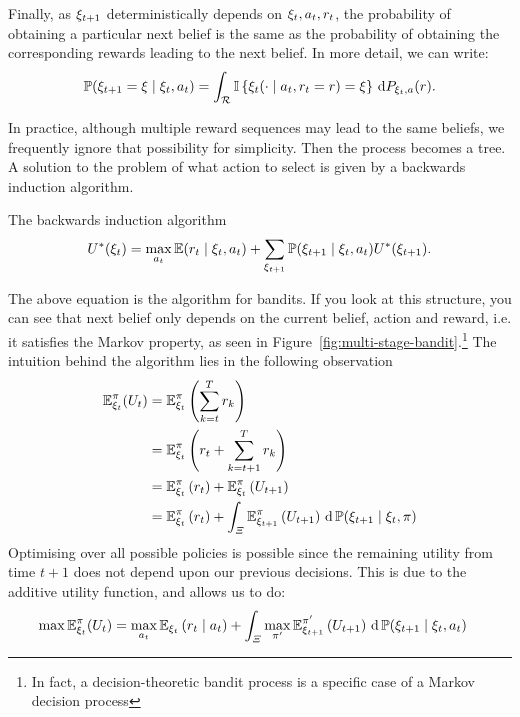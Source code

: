 \begin{definition}
  Finally, as $\xi_{t+1}$ deterministically depends on $\xi_t, a_t, r_t$, the probability of obtaining a particular next belief is the same as the probability of obtaining the corresponding rewards leading to the next belief. In more detail, we can write:
  \begin{equation}
    \label{eq:dt-bandit-belief-probability}
    \mathop{\mbox{\ensuremath{\mathbb{P}}}}\nolimits(\xi_{t+1} = \xi \mid \xi_t, a_t)
    =
    \int_{\mathcal{R}} \mathop{\mbox{\ensuremath{\mathbb{I}}}}\left\{\xi_{t}(\cdot \mid a_t, r_t = r) = \xi\right\} \,\mathrm{d}{P_{\xi_t, a}}(r). 
  \end{equation}
\end{definition}
In practice, although multiple reward sequences may lead to the same beliefs, we frequently ignore that possibility for simplicity. Then the process becomes a tree. A solution to the problem of what action to select is given by a backwards induction algorithm.
\begin{block}{The backwards induction algorithm}
  \begin{equation}
    U^*(\xi_t) = \max_{a_t} \mathop{\mbox{\ensuremath{\mathbb{E}}}}\nolimits(r_t \mid \xi_t, a_t) + \sum_{\xi_{t+1}} \mathop{\mbox{\ensuremath{\mathbb{P}}}}\nolimits(\xi_{t+1} \mid \xi_t, a_t) U^*(\xi_{t+1}).\label{eq:backwards-induction-bandits}
  \end{equation}
\end{block}
The above equation is the  algorithm for bandits.  If you look at this structure, you can see that  next belief only depends on the current belief, action and reward, i.e. it satisfies the Markov property, as seen in Figure~\ref{fig:multi-stage-bandit}.\footnote{In fact, a decision-theoretic bandit process is a specific case of a Markov decision process}
The intuition behind the algorithm lies in the following observation
\begin{align}
  \mathop{\mbox{\ensuremath{\mathbb{E}}}}\nolimits^\pi_{\xi_t}(U_t) 
  &=
    \mathop{\mbox{\ensuremath{\mathbb{E}}}}\nolimits^\pi_{\xi_t}\left( 
    \sum_{k=t}^T r_k
    \right)\\
  &=
    \mathop{\mbox{\ensuremath{\mathbb{E}}}}\nolimits^\pi_{\xi_t}
    \left( 
    r_t
    +
    \sum_{k=t+1}^T r_k
    \right)\\
  &=
    \mathop{\mbox{\ensuremath{\mathbb{E}}}}\nolimits^\pi_{\xi_t}
    \left( 
    r_t
    \right)
    +
    \mathop{\mbox{\ensuremath{\mathbb{E}}}}\nolimits^\pi_{\xi_t}
    \left(
    U_{t+1}
    \right)\\
  &=
    \mathop{\mbox{\ensuremath{\mathbb{E}}}}\nolimits^\pi_{\xi_t}
    \left( 
    r_t
    \right)
    +
    \int_{\Xi}
    \mathop{\mbox{\ensuremath{\mathbb{E}}}}\nolimits^\pi_{\xi_{t+1}}
    \left(
    U_{t+1}
    \right)
    \,\mathrm{d} \mathop{\mbox{\ensuremath{\mathbb{P}}}}\nolimits(\xi_{t+1} \mid \xi_t, \pi)
\end{align}
Optimising over all possible policies is possible since the remaining utility from time $t+1$ does not depend upon our previous decisions. This is due to the additive utility function, and allows us to do:
\begin{align}
  \max \mathop{\mbox{\ensuremath{\mathbb{E}}}}\nolimits^\pi_{\xi_t}(U_t) 
  &=
    \max_{a_t}
    \mathop{\mbox{\ensuremath{\mathbb{E}}}}\nolimits_{\xi_t}
    \left( 
    r_t
    \mid a_t
    \right)
    +
    \int_{\Xi}
    \max_{\pi'}
    \mathop{\mbox{\ensuremath{\mathbb{E}}}}\nolimits^{\pi'}_{\xi_{t+1}}
    \left(
    U_{t+1}
    \right)
    \,\mathrm{d} \mathop{\mbox{\ensuremath{\mathbb{P}}}}\nolimits(\xi_{t+1} \mid \xi_t, a_t)
\end{align}


